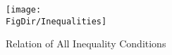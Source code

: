 \tikzset{node distance=5cm, auto, >=latex}
\begin{figure}[h]
  \hypertarget{Inequalities}{}
  \centerline{
    \texttt{[image: \\FigDir/Inequalities]}
  }
  \caption{Relation of All Inequality Conditions} \label{fig:Inequalities}
\end{figure}
